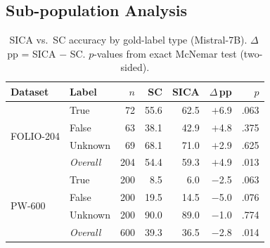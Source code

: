 
\subsection{Sub-population Analysis}
\label{app:subpopulation}

\begin{table}[h]
\centering
\small
\caption{SICA vs.\ SC accuracy by gold-label type (Mistral-7B). $\Delta$\,pp = SICA $-$ SC. $p$-values from exact McNemar test (two-sided).}
\label{tab:subpop-answer-type}
\begin{tabular}{ll rrr rr}
\toprule
\textbf{Dataset} & \textbf{Label} & $n$ & \textbf{SC} & \textbf{SICA} & $\Delta$\,pp & $p$ \\
\midrule
\multirow{4}{*}{FOLIO-204}
 & True    &  72 & 55.6 & 62.5 & $+$6.9 & .063 \\
 & False   &  63 & 38.1 & 42.9 & $+$4.8 & .375 \\
 & Unknown &  69 & 68.1 & 71.0 & $+$2.9 & .625 \\
 & \textit{Overall} & 204 & 54.4 & 59.3 & $+$4.9 & .013\rlap{*} \\
\midrule
\multirow{4}{*}{PW-600}
 & True    & 200 &  8.5 &  6.0 & $-$2.5 & .063 \\
 & False   & 200 & 19.5 & 14.5 & $-$5.0 & .076 \\
 & Unknown & 200 & 90.0 & 89.0 & $-$1.0 & .774 \\
 & \textit{Overall} & 600 & 39.3 & 36.5 & $-$2.8 & .014\rlap{*} \\
\bottomrule
\end{tabular}
\end{table}

